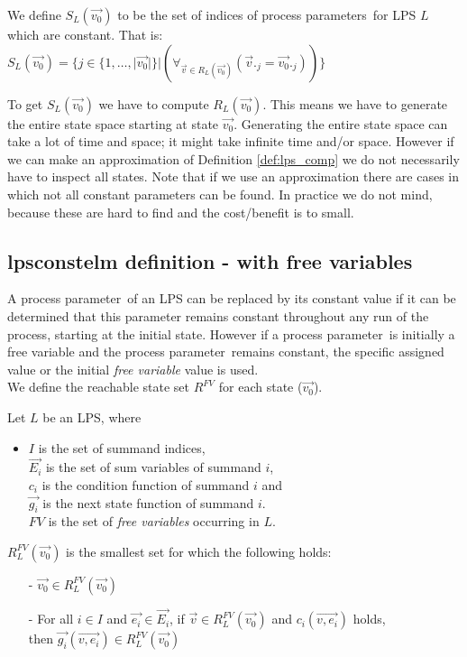 \index{}\documentclass[a4paper,10pt]{article}
\theoremstyle{plain}
\theoremstyle{definition}
\newcommand{\ovr}{\overrightarrow}
\newcommand{\pp}{process parameter}
\newcommand{\pps}{process parameters}
\newcommand{\ti}{\textit}
\begin{document}
\begin{defn}\label{def:lps_comp} We define $S_L(\ovr{v_0})$ to be the set of indices of \pps\ for LPS $L$ which are constant. That is:\\

$S_L(\ovr{v_0}) = \lbrace j \in  \lbrace 1, \ldots, \vert \ovr{v_0}\vert  \rbrace \vert (\forall_{\ovr{v} \in R_L(\ovr{v_0})}( \ovr{v}._j = \ovr{v_{0}}._j)) \rbrace $
\end{defn}

To get $S_L(\ovr{v_0})$ we have to compute $R_L(\ovr{v_0})$. This means we have to generate the entire state space starting at state $\ovr{v_0}$. Generating the entire state space can take a lot of time and space; it might take infinite time and/or space. However if we can make an approximation of Definition \ref{def:lps_comp} we do not necessarily have to inspect all states. Note that if we use an approximation there are cases in which not all constant parameters can be found. In practice we do not mind, because these are hard to find and the cost/benefit is to small.

\subsection{lpsconstelm definition - with free variables}

A \pp\ of an LPS can be replaced by its constant value if it can be determined that this parameter remains constant throughout any run of the process, starting at the initial state. However if a \pp\ is initially a free variable and the \pp\ remains constant, the specific assigned value or the initial \ti{free variable} value is used.\\

We define the reachable state set $R^{FV}$ for each state ($\ovr{v_0}$).
\begin{defn} Let $L$ be an LPS, where\begin{itemize}
\item $I$ is the set of summand indices, \\ $\ovr{E_i}$ is the set of sum variables of summand $i$, \\ $c_i$ is the condition function of summand $i$ and \\ $\ovr{g_i}$ is the next state function of summand $i$. \\
$FV$ is the set of \ti{free variables} occurring in $L$.\\
\end{itemize}

$R_L^{FV}(\ovr{v_0})$ is the smallest set for which the following holds:
  \begin{itemize}
    \item[-] $\ovr{v_0} \in R_L^{FV}(\ovr{v_0})$
    \item[-] For all $i \in I$ and $\ovr{e_i} \in \ovr{E_i}$, if $\ovr{v} \in R_L^{FV}(\ovr{v_0})$ and $c_i(\ovr{v, e_i})$ holds, \\ then $\ovr{g_i}(\ovr{v, e_i}) \in R_L^{FV}(\ovr{v_0})$ \\
   \end{itemize}
\end{defn}
\end{document}
